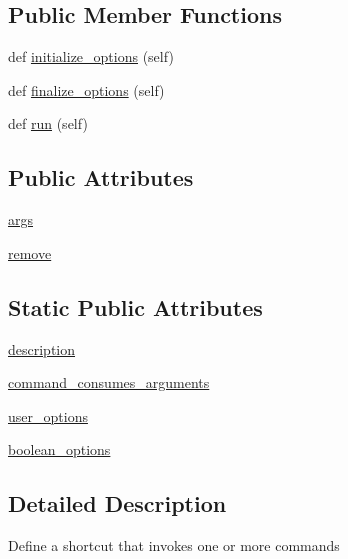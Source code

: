 \subsection*{Public Member Functions}
\begin{DoxyCompactItemize}
\item 
def \hyperlink{classsetuptools_1_1command_1_1alias_1_1alias_a0aeb707cb88f10ec59c302f165d1cfd0}{initialize\+\_\+options} (self)
\item 
def \hyperlink{classsetuptools_1_1command_1_1alias_1_1alias_a790538ebcd744e88e5a2f806f1d11f93}{finalize\+\_\+options} (self)
\item 
def \hyperlink{classsetuptools_1_1command_1_1alias_1_1alias_a18403f966465c1665f92e08ec188aa2a}{run} (self)
\end{DoxyCompactItemize}
\subsection*{Public Attributes}
\begin{DoxyCompactItemize}
\item 
\hyperlink{classsetuptools_1_1command_1_1alias_1_1alias_a4351af0dab2928c3e5811425cd26ff45}{args}
\item 
\hyperlink{classsetuptools_1_1command_1_1alias_1_1alias_a3de85705b6935c662ccecee8cc2b59d9}{remove}
\end{DoxyCompactItemize}
\subsection*{Static Public Attributes}
\begin{DoxyCompactItemize}
\item 
\hyperlink{classsetuptools_1_1command_1_1alias_1_1alias_a6765fd24d620aaedc2837843b1002bdb}{description}
\item 
\hyperlink{classsetuptools_1_1command_1_1alias_1_1alias_a7ca22e679072c147bae8a030250d77f9}{command\+\_\+consumes\+\_\+arguments}
\item 
\hyperlink{classsetuptools_1_1command_1_1alias_1_1alias_a52690830df1a1e4ac7a64632d21d3ee4}{user\+\_\+options}
\item 
\hyperlink{classsetuptools_1_1command_1_1alias_1_1alias_aefdfd87968352a45374d295ebcb6d363}{boolean\+\_\+options}
\end{DoxyCompactItemize}


\subsection{Detailed Description}
\begin{DoxyVerb}Define a shortcut that invokes one or more commands\end{DoxyVerb}
 

